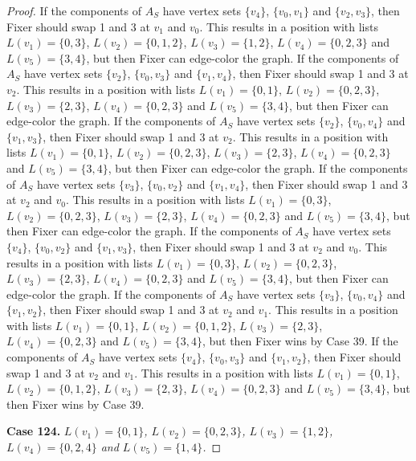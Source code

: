 \documentclass[12pt]{amsart}
\theoremstyle{plain}
\theoremstyle{definition}
\theoremstyle{remark}
\begin{document}
\begin{proof}
If the components of $A_S$ have vertex sets $\{v_4\}$, $\{v_0, v_1\}$ and $\{v_2, v_3\}$, then Fixer should swap 1 and 3 at $v_1$ and $v_0$. This results in a position with lists $L(v_1) = \{0, 3\}$, $L(v_2) = \{0, 1, 2\}$, $L(v_3) = \{1, 2\}$, $L(v_4) = \{0, 2, 3\}$ and $L(v_5) = \{3, 4\}$, but then Fixer can edge-color the graph.
If the components of $A_S$ have vertex sets $\{v_2\}$, $\{v_0, v_3\}$ and $\{v_1, v_4\}$, then Fixer should swap 1 and 3 at $v_2$. This results in a position with lists $L(v_1) = \{0, 1\}$, $L(v_2) = \{0, 2, 3\}$, $L(v_3) = \{2, 3\}$, $L(v_4) = \{0, 2, 3\}$ and $L(v_5) = \{3, 4\}$, but then Fixer can edge-color the graph.
If the components of $A_S$ have vertex sets $\{v_2\}$, $\{v_0, v_4\}$ and $\{v_1, v_3\}$, then Fixer should swap 1 and 3 at $v_2$. This results in a position with lists $L(v_1) = \{0, 1\}$, $L(v_2) = \{0, 2, 3\}$, $L(v_3) = \{2, 3\}$, $L(v_4) = \{0, 2, 3\}$ and $L(v_5) = \{3, 4\}$, but then Fixer can edge-color the graph.
If the components of $A_S$ have vertex sets $\{v_3\}$, $\{v_0, v_2\}$ and $\{v_1, v_4\}$, then Fixer should swap 1 and 3 at $v_2$ and $v_0$. This results in a position with lists $L(v_1) = \{0, 3\}$, $L(v_2) = \{0, 2, 3\}$, $L(v_3) = \{2, 3\}$, $L(v_4) = \{0, 2, 3\}$ and $L(v_5) = \{3, 4\}$, but then Fixer can edge-color the graph.
If the components of $A_S$ have vertex sets $\{v_4\}$, $\{v_0, v_2\}$ and $\{v_1, v_3\}$, then Fixer should swap 1 and 3 at $v_2$ and $v_0$. This results in a position with lists $L(v_1) = \{0, 3\}$, $L(v_2) = \{0, 2, 3\}$, $L(v_3) = \{2, 3\}$, $L(v_4) = \{0, 2, 3\}$ and $L(v_5) = \{3, 4\}$, but then Fixer can edge-color the graph.
If the components of $A_S$ have vertex sets $\{v_3\}$, $\{v_0, v_4\}$ and $\{v_1, v_2\}$, then Fixer should swap 1 and 3 at $v_2$ and $v_1$. This results in a position with lists $L(v_1) = \{0, 1\}$, $L(v_2) = \{0, 1, 2\}$, $L(v_3) = \{2, 3\}$, $L(v_4) = \{0, 2, 3\}$ and $L(v_5) = \{3, 4\}$, but then Fixer wins by Case 39.
If the components of $A_S$ have vertex sets $\{v_4\}$, $\{v_0, v_3\}$ and $\{v_1, v_2\}$, then Fixer should swap 1 and 3 at $v_2$ and $v_1$. This results in a position with lists $L(v_1) = \{0, 1\}$, $L(v_2) = \{0, 1, 2\}$, $L(v_3) = \{2, 3\}$, $L(v_4) = \{0, 2, 3\}$ and $L(v_5) = \{3, 4\}$, but then Fixer wins by Case 39.

\noindent\textbf{Case 124.  }\textit{$L(v_1) = \{0, 1\}$, $L(v_2) = \{0, 2, 3\}$, $L(v_3) = \{1, 2\}$, $L(v_4) = \{0, 2, 4\}$ and $L(v_5) = \{1, 4\}$.}


\end{proof}
\end{document}

